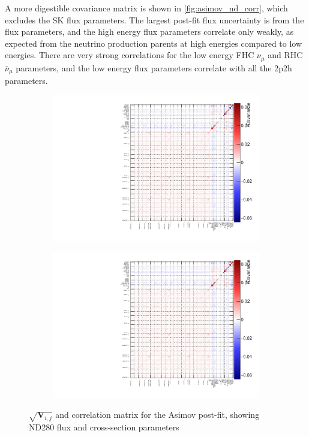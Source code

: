 A more digestible covariance matrix is shown in \autoref{fig:asimov_nd_corr}, which excludes the SK flux parameters. The largest post-fit flux uncertainty is from the \nue flux parameters, and the high energy flux parameters correlate only weakly, as expected from the neutrino production parents at high energies compared to low energies. There are very strong correlations for the low energy FHC $\nu_\mu$ and RHC $\bar{\nu}_\mu$ parameters, and the low energy flux parameters correlate with all the 2p2h parameters.
\begin{figure}[h]
	\begin{subfigure}[t]{0.49\textwidth}
		\includegraphics[width=\textwidth, trim={0mm 0mm 0mm 0mm}, clip,page=5]{figures/mach3/Asimov/2017b_NewDet_NewData_Asimov_Long_0_drawCorr.pdf}
	\end{subfigure}
	\begin{subfigure}[t]{0.49\textwidth}
		\includegraphics[width=\textwidth, trim={0mm 0mm 0mm 0mm}, clip,page=6]{figures/mach3/Asimov/2017b_NewDet_NewData_Asimov_Long_0_drawCorr.pdf}
	\end{subfigure}
	\caption{$\sqrt{\mathbf{V}_{i,j}}$ and correlation matrix for the Asimov post-fit, showing ND280 flux and cross-section parameters}
	\label{fig:asimov_nd_corr}
\end{figure}

